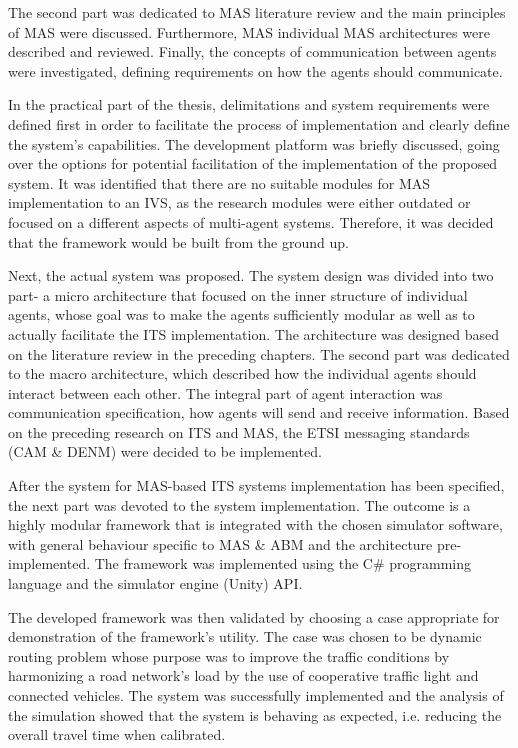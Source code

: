 \documentclass[titlepage, 12pt]{article}
\begin{document}
The second part was dedicated to MAS literature review and the main principles of MAS were discussed. Furthermore, MAS 
individual MAS architectures were described and reviewed. Finally, the concepts of communication between agents were investigated,
defining requirements on how the agents should communicate. 

In the practical part of the thesis, delimitations and system requirements were defined first in order to facilitate the 
process of implementation and clearly define the system's capabilities. The development platform was briefly discussed, 
going over the options for potential facilitation of the implementation of the proposed system. It was identified that 
there are no suitable modules for MAS implementation to an IVS, as the research modules were either outdated or focused on 
a different aspects of multi-agent systems. Therefore, it was decided that the framework would be built from the ground up.

Next, the actual system was proposed. The system design was divided into two part- a micro
architecture that focused on the inner structure of individual agents, whose goal was to make
the agents sufficiently modular as well as to actually facilitate the ITS implementation. The
architecture was designed based on the literature review in the preceding chapters. The second
part was dedicated to the macro architecture, which described how the individual agents should
interact between each other. The integral part of agent interaction was communication
specification, how agents will send and receive information.  Based on the preceding research
on ITS and MAS, the ETSI messaging standards (CAM \& DENM) were decided to be implemented.

After the system for MAS-based ITS systems implementation has been specified, the next part was
devoted to the system implementation.  The outcome is a highly modular framework that is
integrated with the chosen simulator software, with general behaviour specific to MAS \& ABM 
and the architecture pre-implemented. The framework was implemented using the C\# programming 
language and the simulator engine (Unity) API. 

The developed framework was then validated by choosing a case appropriate for demonstration of the 
framework's utility. The case was chosen to be dynamic routing problem whose purpose was to 
improve the traffic conditions by harmonizing a road network's load by the use of cooperative 
traffic light and connected vehicles. The system was successfully implemented and the analysis of the 
simulation showed that the system is behaving as expected, i.e. reducing the overall travel time when 
calibrated.


\clearpage

\thispagestyle{empty}
\listoftables
\listoffigures
\clearpage

\printbibliography
\end{document}
